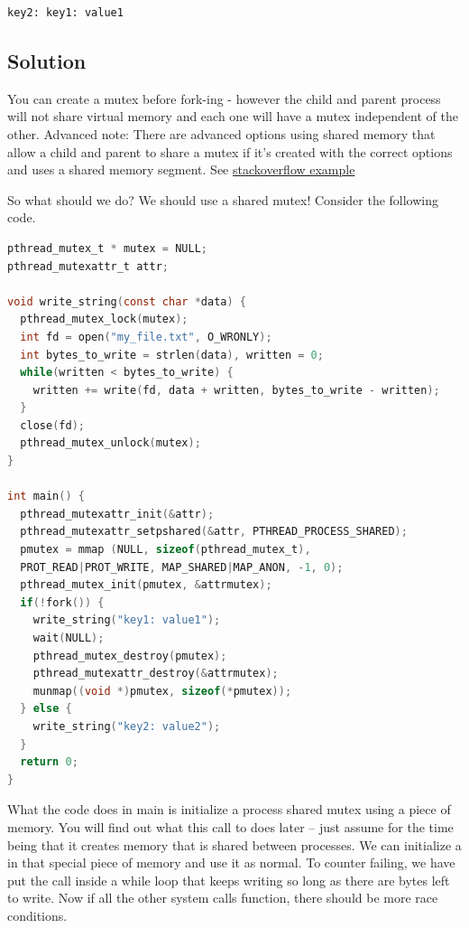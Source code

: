 \begin{lstlisting}
key2: key1: value1
\end{lstlisting}

\subsection{Solution}

You can create a mutex before fork-ing - however the child and parent process will not share virtual memory and each one will have a mutex independent of the other.
Advanced note: There are advanced options using shared memory that allow a child and parent to share a mutex if it's created with the correct options and uses a shared memory segment.
See \href{http://stackoverflow.com/questions/19172541/procs-fork-and-mutexes}{stackoverflow example}

So what should we do? We should use a shared mutex! Consider the following code.

\begin{lstlisting}[language=C]
pthread_mutex_t * mutex = NULL;
pthread_mutexattr_t attr;

void write_string(const char *data) {
  pthread_mutex_lock(mutex);
  int fd = open("my_file.txt", O_WRONLY);
  int bytes_to_write = strlen(data), written = 0;
  while(written < bytes_to_write) {
    written += write(fd, data + written, bytes_to_write - written);
  }
  close(fd);
  pthread_mutex_unlock(mutex);
}

int main() {
  pthread_mutexattr_init(&attr);
  pthread_mutexattr_setpshared(&attr, PTHREAD_PROCESS_SHARED);
  pmutex = mmap (NULL, sizeof(pthread_mutex_t),
  PROT_READ|PROT_WRITE, MAP_SHARED|MAP_ANON, -1, 0);
  pthread_mutex_init(pmutex, &attrmutex);
  if(!fork()) {
    write_string("key1: value1");
    wait(NULL);
    pthread_mutex_destroy(pmutex);
    pthread_mutexattr_destroy(&attrmutex);
    munmap((void *)pmutex, sizeof(*pmutex));
  } else {
    write_string("key2: value2");
  }
  return 0;
}
\end{lstlisting}

What the code does in main is initialize a process shared mutex using a piece of  memory.
You will find out what this call to  does later -- just assume for the time being that it creates memory that is shared between processes.
We can initialize a  in that special piece of memory and use it as normal.
To counter  failing, we have put the  call inside a while loop that keeps writing so long as there are bytes left to write.
Now if all the other system calls function, there should be more race conditions.

